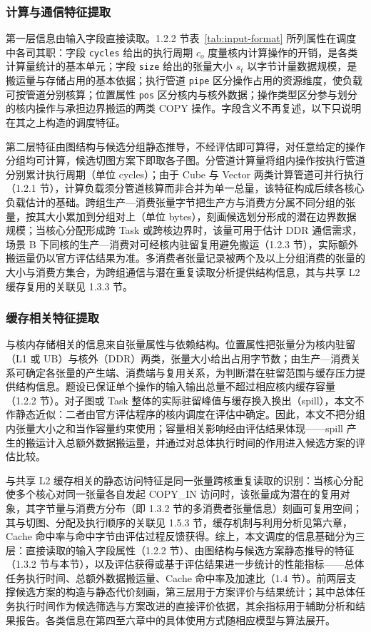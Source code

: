 \subsubsection{计算与通信特征提取}
第一层信息由输入字段直接读取。1.2.2 节表~\ref{tab:input-format} 所列属性在调度中各司其职：字段 \texttt{cycles} 给出的执行周期 $c_o$ 度量核内计算操作的开销，是各类计算量统计的基本单元；字段 \texttt{size} 给出的张量大小 $s_t$ 以字节计量数据规模，是搬运量与存储占用的基本依据；执行管道 \texttt{pipe} 区分操作占用的资源维度，使负载可按管道分别核算；位置属性 \texttt{pos} 区分核内与核外数据；操作类型区分参与划分的核内操作与承担边界搬运的两类 COPY 操作。字段含义不再复述，以下只说明在其之上构造的调度特征。

第二层特征由图结构与候选分组静态推导，不经评估即可算得，对任意给定的操作分组均可计算，候选切图方案下即取各子图。分管道计算量将组内操作按执行管道分别累计执行周期（单位 cycles）；由于 Cube 与 Vector 两类计算管道可并行执行（1.2.1 节），计算负载须分管道核算而非合并为单一总量，该特征构成后续各核心负载估计的基础。跨组生产—消费张量字节把生产方与消费方分属不同分组的张量，按其大小累加到分组对上（单位 bytes），刻画候选划分形成的潜在边界数据规模；当核心分配形成跨 Task 或跨核边界时，该量可用于估计 DDR 通信需求，场景 B 下同核的生产—消费对可经核内驻留复用避免搬运（1.2.3 节），实际额外搬运量仍以官方评估结果为准。多消费者张量记录被两个及以上分组消费的张量的大小与消费方集合，为跨组通信与潜在重复读取分析提供结构信息，其与共享 L2 缓存复用的关联见 1.3.3 节。

\subsubsection{缓存相关特征提取}
与核内存储相关的信息来自张量属性与依赖结构。位置属性把张量分为核内驻留（L1 或 UB）与核外（DDR）两类，张量大小给出占用字节数；由生产—消费关系可确定各张量的产生端、消费端与复用关系，为判断潜在驻留范围与缓存压力提供结构信息。题设已保证单个操作的输入输出总量不超过相应核内缓存容量（1.2.2 节）。对子图或 Task 整体的实际驻留峰值与缓存换入换出（spill），本文不作静态近似：二者由官方评估程序的核内调度在评估中确定。因此，本文不把分组内张量大小之和当作容量约束使用；容量相关影响经由评估结果体现——spill 产生的搬运计入总额外数据搬运量，并通过对总体执行时间的作用进入候选方案的评估比较。

与共享 L2 缓存相关的静态访问特征是同一张量跨核重复读取的识别：当核心分配使多个核心对同一张量各自发起 COPY\_IN 访问时，该张量成为潜在的复用对象，其字节量与消费方分布（即 1.3.2 节的多消费者张量信息）刻画可复用空间；其与切图、分配及执行顺序的关联见 1.5.3 节，缓存机制与利用分析见第六章，Cache 命中率与命中字节由评估过程反馈获得。综上，本文调度的信息基础分为三层：直接读取的输入字段属性（1.2.2 节）、由图结构与候选方案静态推导的特征（1.3.2 节与本节），以及评估获得或基于评估结果进一步统计的性能指标——总体任务执行时间、总额外数据搬运量、Cache 命中率及加速比（1.4 节）。前两层支撑候选方案的构造与静态代价刻画，第三层用于方案评价与结果统计；其中总体任务执行时间作为候选筛选与方案改进的直接评价依据，其余指标用于辅助分析和结果报告。各类信息在第四至六章中的具体使用方式随相应模型与算法展开。

